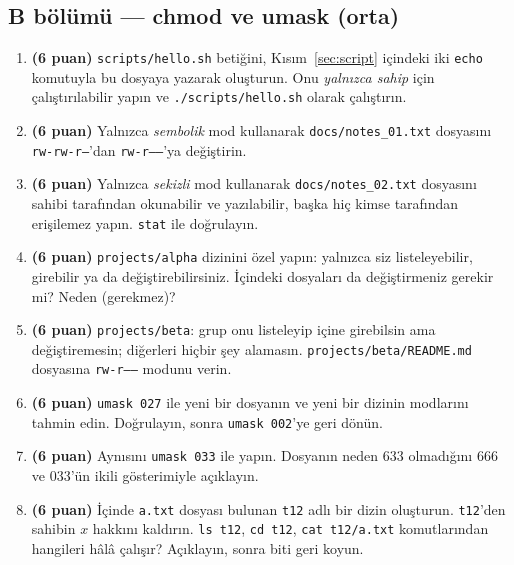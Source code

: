 \documentclass[11pt,a4paper]{article}
\newcommand{\cmd}[1]{\texttt{#1}}
\begin{document}
\subsection*{B bölümü --- chmod ve umask (orta)}
\begin{enumerate}[leftmargin=1.8em,label=\textbf{\arabic*.},resume]
  \item \textbf{(6 puan)} \texttt{scripts/hello.sh} betiğini, Kısım~\ref{sec:script} içindeki iki \cmd{echo} komutuyla bu dosyaya yazarak oluşturun. Onu \emph{yalnızca sahip} için çalıştırılabilir yapın ve \cmd{./scripts/hello.sh} olarak çalıştırın.
  \item \textbf{(6 puan)} Yalnızca \emph{sembolik} mod kullanarak \texttt{docs/notes\_01.txt} dosyasını \texttt{rw-rw-r--}'dan \texttt{rw-r-----}'ya değiştirin.
  \item \textbf{(6 puan)} Yalnızca \emph{sekizli} mod kullanarak \texttt{docs/notes\_02.txt} dosyasını sahibi tarafından okunabilir ve yazılabilir, başka hiç kimse tarafından erişilemez yapın. \cmd{stat} ile doğrulayın.
  \item \textbf{(6 puan)} \texttt{projects/alpha} dizinini özel yapın: yalnızca siz listeleyebilir, girebilir ya da değiştirebilirsiniz. İçindeki dosyaları da değiştirmeniz gerekir mi? Neden (gerekmez)?
  \item \textbf{(6 puan)} \texttt{projects/beta}: grup onu listeleyip içine girebilsin ama değiştiremesin; diğerleri hiçbir şey alamasın. \texttt{projects/beta/README.md} dosyasına \texttt{rw-r-----} modunu verin.
  \item \textbf{(6 puan)} \texttt{umask 027} ile yeni bir dosyanın ve yeni bir dizinin modlarını tahmin edin. Doğrulayın, sonra \texttt{umask 002}'ye geri dönün.
  \item \textbf{(6 puan)} Aynısını \texttt{umask 033} ile yapın. Dosyanın neden $633$ olmadığını $666$ ve $033$'ün ikili gösterimiyle açıklayın.
  \item \textbf{(6 puan)} İçinde \texttt{a.txt} dosyası bulunan \texttt{t12} adlı bir dizin oluşturun. \texttt{t12}'den sahibin $x$ hakkını kaldırın. \cmd{ls t12}, \cmd{cd t12}, \cmd{cat t12/a.txt} komutlarından hangileri hâlâ çalışır? Açıklayın, sonra biti geri koyun.
\end{enumerate}
\end{document}
